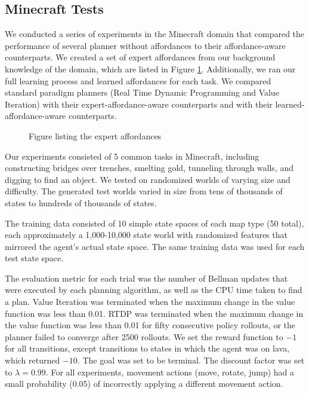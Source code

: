 \documentclass[conference]{IEEEtran}
\begin{document}
\subsection{Minecraft Tests}
We conducted a series of experiments in the Minecraft domain that
compared the performance of several planner without affordances
to their affordance-aware counterparts. We created a set of expert
affordances from our background knowledge of the domain, which are
listed in Figure \ref{fig:afford_kb_exp}. Additionally, we ran our full
learning process and learned affordances for each task. We compared
standard paradigm planners (Real Time Dynamic Programming and 
Value Iteration) with their expert-affordance-aware counterparts and with
their learned-affordance-aware counterparts.

\begin{figure}
Figure listing the expert affordances
\label{fig:afford_kb_exp}
\end{figure}

Our experiments consisted of 5 common tasks in Minecraft, including
constructing bridges over trenches, smelting gold, tunneling
through walls, and digging to find an object.  We tested on 
randomized worlds of varying size and difficulty. The generated test
worlds varied in size from tens of thousands of states to hundreds of thousands of states.

The training data consisted of 10 simple state spaces of each map type
(50 total), each approximately a 1,000-10,000 state world with randomized
features that mirrored the agent's actual state space. The same training data
was used for each test state space.

The evaluation metric for each trial was the
number of Bellman updates that were executed by each planning
algorithm, as well as the CPU time taken to find a plan. Value Iteration
was terminated when the maximum change in the value function was 
less than 0.01. RTDP was terminated when the maximum change in 
the value function was less than 0.01 for fifty consecutive policy rollouts,
or the planner failed to converge after 2500 rollouts. We set the reward 
function to $-1$ for all transitions, except transitions to states in which 
the agent was on lava, which returned $-10$. The goal was set to be 
terminal. The discount factor was set to $\lambda = 0.99$. For all experiments,
movement actions (move, rotate, jump) had a small probability (0.05) of 
incorrectly applying a different movement action.
\end{document}
